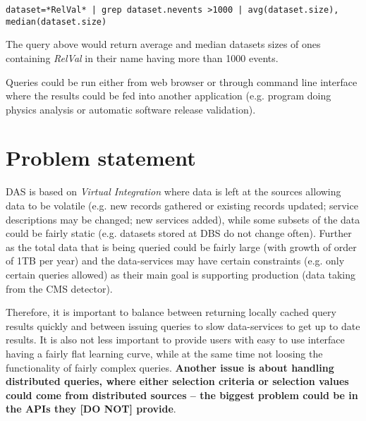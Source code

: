 \documentclass[a4paper,11pt,draft]{article}
\begin{document}
{\footnotesize 
\begin{verbatim}
dataset=*RelVal* | grep dataset.nevents >1000 | avg(dataset.size), median(dataset.size)
\end{verbatim}
}

The query above would return average and median datasets sizes  of ones containing  \textit{RelVal} in their name having more than 1000 events.

Queries could be run either from web browser or through  command line interface where the results could  be fed into another application (e.g. program doing physics analysis or automatic software release validation).



\section{Problem statement}

DAS is based on \textit{Virtual Integration} where data is left at the sources allowing data to be volatile (e.g. new records gathered or existing records updated; service descriptions may be changed; new services added), while some subsets of the data could be fairly static (e.g. datasets stored at DBS do not change often). 
Further as the total data that is being queried could be fairly large (with growth of order of 1TB per year) and the data-services may have certain constraints (e.g. only certain queries allowed) as their main goal is supporting production (data taking from the CMS detector).

Therefore, it is important to balance between returning locally cached query results quickly   and between issuing queries to slow data-services to get up to date results.
It is also not less important to provide users with easy to use interface having a fairly flat learning curve, while at the same time not loosing the functionality of fairly complex queries. %
\textbf{\color{red}Another issue is about handling distributed queries, where either selection criteria or selection values could come from distributed sources -- the biggest problem could be in the APIs they [DO NOT] provide}.


\end{document}
